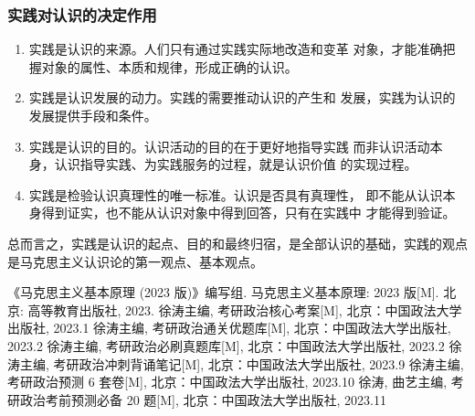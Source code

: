 \documentclass[utf-8, 10pt]{article}
\begin{document}
{\color{red}
\subsubsection{实践对认识的决定作用}

\begin{enumerate}[label={${\arabic*}^\circ$}, itemsep=0pt]
    \item {\kaishu 实践是认识的来源}。人们只有通过实践实际地改造和变革
    对象，才能准确把握对象的属性、本质和规律，形成正确的认识。
    \item {\kaishu 实践是认识发展的动力}。实践的需要推动认识的产生和
    发展，实践为认识的发展提供手段和条件。
    \item {\kaishu 实践是认识的目的}。认识活动的目的在于更好地指导实践
    而非认识活动本身，认识指导实践、为实践服务的过程，就是认识价值
    的实现过程。
    \item {\kaishu 实践是检验认识真理性的唯一标准}。认识是否具有真理性，
    即不能从认识本身得到证实，也不能从认识对象中得到回答，只有在实践中
    才能得到验证。
\end{enumerate}
总而言之，实践是认识的起点、目的和最终归宿，是全部认识的基础，实践的观点
是马克思主义认识论的第一观点、基本观点。}

\begin{thebibliography}{1}
    《马克思主义基本原理 (2023 版)》编写组. 马克思主义基本原理: 2023 版[M].
    北京: 高等教育出版社, 2023.
    徐涛主编, 考研政治核心考案[M], 北京：中国政法大学出版社, 2023.1
    徐涛主编, 考研政治通关优题库[M], 北京：中国政法大学出版社, 2023.2
    徐涛主编, 考研政治必刷真题库[M], 北京：中国政法大学出版社, 2023.2
    徐涛主编, 考研政治冲刺背诵笔记[M], 北京：中国政法大学出版社, 2023.9
    徐涛主编, 考研政治预测 6 套卷[M], 北京：中国政法大学出版社, 2023.10
    徐涛, 曲艺主编, 考研政治考前预测必备 20 题[M], 北京：中国政法大学出版社, 2023.11
\end{thebibliography}
\end{document}
